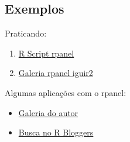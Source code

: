 

\subsection{Exemplos}

\begin{frame}
  Praticando:
  \begin{enumerate}
  \item \href{run:./R/rpanel/rpanel.R}{R Script rpanel}
  \item \href{run:rpanel.html}{Galeria rpanel iguir2}
  \end{enumerate}

  \vspace{0.5cm} Algumas aplicações com o rpanel:
  \begin{itemize}
  \item \href{http://www.stats.gla.ac.uk/~adrian/rpanel/}{Galeria do
      autor}
  \item \href{http://www.r-bloggers.com/?s=rpanel}{Busca no R Bloggers}
  \end{itemize}

\end{frame}

